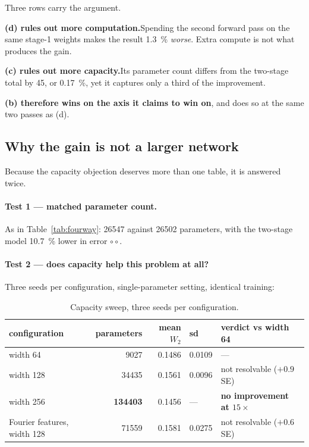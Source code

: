 ﻿\documentclass[11pt,a4paper]{article}
\newcommand{\Wtwo}{W_2}
\newcommand{\weak}{\textcolor{red!65!black}{\textbullet$\circ\circ$}}
\begin{document}
Three rows carry the argument.

\textbf{(d) rules out more computation.}\hspace{0.4em}Spending the second forward pass on the
same stage-1 weights makes the result \SI{1.3}{\percent} \emph{worse}. Extra compute is not what
produces the gain.

\textbf{(c) rules out more capacity.}\hspace{0.4em}Its parameter count differs from the
two-stage total by 45, or \SI{0.17}{\percent}, yet it captures only a third of the improvement.

\textbf{(b) therefore wins on the axis it claims to win on}, and does so at the same two passes
as (d).

\subsection{Why the gain is not a larger network}
\label{sec:capacity}

Because the capacity objection deserves more than one table, it is answered twice.

\paragraph{Test 1 --- matched parameter count.} As in Table~\ref{tab:fourway}: \num{26547}
against \num{26502} parameters, with the two-stage model \SI{10.7}{\percent} lower in error
\weak.

\paragraph{Test 2 --- does capacity help this problem at all?} Three seeds per configuration,
single-parameter setting, identical training:

\begin{table}[h]
\centering\small
\begin{tabular}{@{}lrrll@{}}
\toprule
configuration & parameters & mean $\Wtwo$ & sd & verdict vs width 64 \\
\midrule
width 64 & \num{9027} & 0.1486 & 0.0109 & --- \\
width 128 & \num{34435} & 0.1561 & 0.0096 & not resolvable ($+0.9$ SE) \\
width 256 & \textbf{\num{134403}} & 0.1456 & --- & \textbf{no improvement at $15\times$} \\
Fourier features, width 128 & \num{71559} & 0.1581 & 0.0275 & not resolvable ($+0.6$ SE) \\
\bottomrule
\end{tabular}
\caption{Capacity sweep, three seeds per configuration.}
\end{table}
\end{document}
